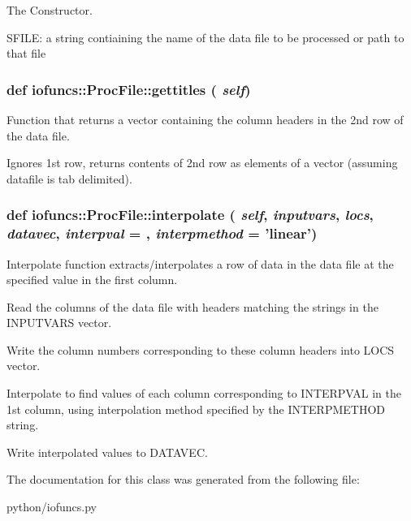 The Constructor. 

SFILE: a string contiaining the name of the data file to be processed or path to that file \hypertarget{classiofuncs_1_1ProcFile_a88f142260af3fd70b1b8613da471f858}{
\subsubsection[{gettitles}]{\setlength{\rightskip}{0pt plus 5cm}def iofuncs::ProcFile::gettitles ( {\em self})}}
\label{d3/d16/classiofuncs_1_1ProcFile_a88f142260af3fd70b1b8613da471f858}


Function that returns a vector containing the column headers in the 2nd row of the data file. 

Ignores 1st row, returns contents of 2nd row as elements of a vector (assuming datafile is tab delimited). \hypertarget{classiofuncs_1_1ProcFile_ae7f8d6213747a8d1e41b771ec71cd2be}{
\subsubsection[{interpolate}]{\setlength{\rightskip}{0pt plus 5cm}def iofuncs::ProcFile::interpolate ( {\em self}, \/   {\em inputvars}, \/   {\em locs}, \/   {\em datavec}, \/   {\em interpval} = {}, \/   {\em interpmethod} = {\ttfamily 'linear'})}}
\label{d3/d16/classiofuncs_1_1ProcFile_ae7f8d6213747a8d1e41b771ec71cd2be}


Interpolate function extracts/interpolates a row of data in the data file at the specified value in the first column. 

Read the columns of the data file with headers matching the strings in the INPUTVARS vector.

Write the column numbers corresponding to these column headers into LOCS vector.

Interpolate to find values of each column corresponding to INTERPVAL in the 1st column, using interpolation method specified by the INTERPMETHOD string.

Write interpolated values to DATAVEC. 

The documentation for this class was generated from the following file:\begin{DoxyCompactItemize}
\item 
python/iofuncs.py\end{DoxyCompactItemize}
